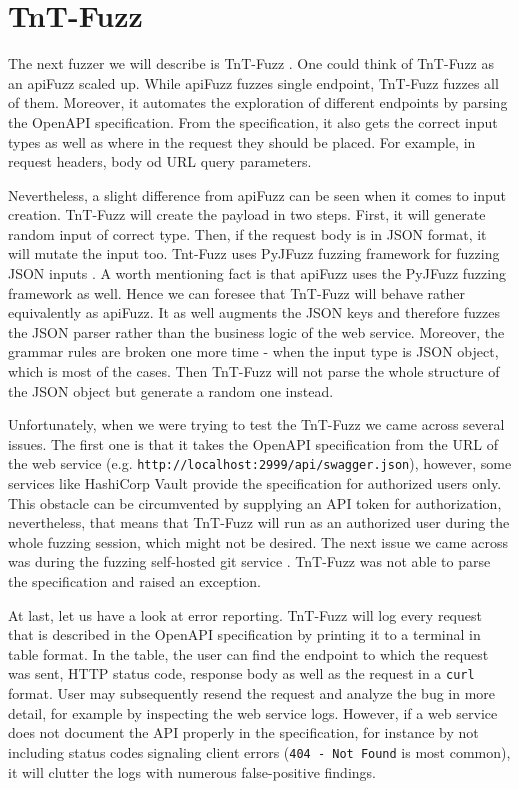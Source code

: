\section{TnT-Fuzz}
\label{sec:tnt-fuzz}
The next fuzzer we will describe is TnT-Fuzz \cite{tntFuzzer2020github}. One could think of  TnT-Fuzz as an apiFuzz scaled up. While apiFuzz fuzzes single endpoint, TnT-Fuzz fuzzes all of them. Moreover, it automates the exploration of different endpoints by parsing the OpenAPI specification. From the specification, it also gets the correct input types as well as where in the request they should be placed. For example, in request headers, body od URL query parameters.

Nevertheless, a slight difference from apiFuzz can be seen when it comes to input creation. TnT-Fuzz will create the payload in two steps. First, it will generate random input of correct type. Then, if the request body is in JSON format, it will mutate the input too. Tnt-Fuzz uses PyJFuzz fuzzing framework for fuzzing JSON inputs \cite{pyjfuzz2020github}. A worth mentioning fact is that apiFuzz uses the PyJFuzz fuzzing framework as well. Hence we can foresee that TnT-Fuzz will behave rather equivalently as apiFuzz. It as well augments the JSON keys and therefore fuzzes the JSON parser rather than the business logic of the web service. Moreover, the grammar rules are broken one more time - when the input type is JSON object, which is most of the cases. Then TnT-Fuzz will not parse the whole structure of the JSON object but generate a random one instead.

Unfortunately, when we were trying to test the TnT-Fuzz we came across several issues. The first one is that it takes the OpenAPI specification from the URL of the web service (e.g. \texttt{http://localhost:2999/api/swagger.json}), however, some services like HashiCorp Vault \cite{vault2020github} provide the specification for authorized users only. This obstacle can be circumvented by supplying an API token for authorization, nevertheless, that means that TnT-Fuzz will run as an authorized user during the whole fuzzing session, which might not be desired. The next issue we came across was during the fuzzing self-hosted git service \cite{gitea2020web}. TnT-Fuzz was not able to parse the specification and raised an exception.

At last, let us have a look at error reporting. TnT-Fuzz will log every request that is described in the OpenAPI specification by printing it to a terminal in table format. In the table, the user can find the endpoint to which the request was sent, HTTP status code, response body as well as the request in a \texttt{curl} format. User may subsequently resend the request and analyze the bug in more detail, for example by inspecting the web service logs. However, if a web service does not document the API properly in the specification, for instance by not including status codes signaling client errors (\texttt{404 - Not Found} is most common), it will clutter the logs with numerous false-positive findings.


